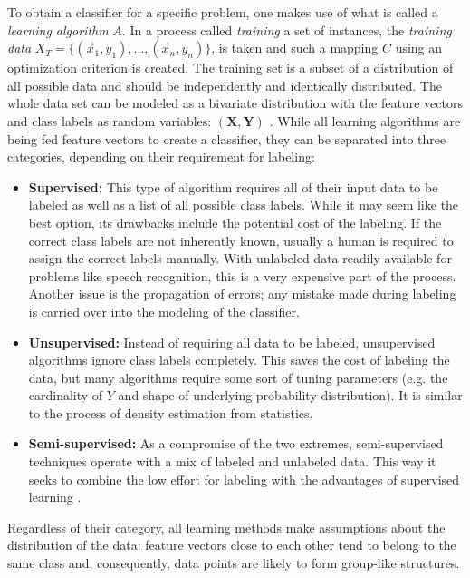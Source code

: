 To obtain a classifier for a specific problem, one makes use of what is called a \textit{learning algorithm} $A$. In a process called \textit{training} a set of instances, the \textit{training data} $X_T = \{(\vec{x}_1, y_1), ..., (\vec{x}_n, y_n)\}$, is taken and such a mapping $C$ using an optimization criterion is created. The training set is a subset of a distribution of all possible data and should be independently and identically distributed. The whole data set can be modeled as a bivariate distribution with the feature vectors and class labels as random variables: $(\mathbf{X}, \mathbf{Y})$ \cite{RodriguezEtAl2013}. While all learning algorithms are being fed feature vectors to create a classifier, they can be separated into three categories, depending on their requirement for labeling:
\begin{itemize}
\item \textbf{Supervised:}
This type of algorithm requires all of their input data to be labeled as well as a list of all possible class labels. While it may seem like the best option, its drawbacks include the potential cost of the labeling. If the correct class labels are not inherently known, usually a human is required to assign the correct labels manually. With unlabeled data readily available for problems like speech recognition, this is a very expensive part of the process. Another issue is the propagation of errors; any mistake made during labeling is carried over into the modeling of the classifier.

\item \textbf{Unsupervised:}
Instead of requiring all data to be labeled, unsupervised algorithms ignore class labels completely. This saves the cost of labeling the data, but many algorithms require some sort of tuning parameters (e.g. the cardinality of $Y$ and shape of underlying probability distribution). It is similar to the process of density estimation from statistics.

\item \textbf{Semi-supervised:}
As a compromise of the two extremes, semi-supervised techniques operate with a mix of labeled and unlabeled data. This way it seeks to combine the low effort for labeling with the advantages of supervised learning \cite{ZhuEtAl2009}.
\end{itemize}

Regardless of their category, all learning methods make assumptions about the distribution of the data: feature vectors close to each other tend to belong to the same class and, consequently, data points are likely to form group-like structures.

